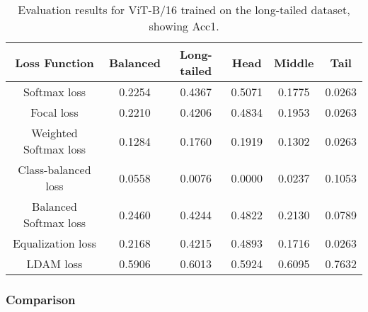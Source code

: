 \begin{table}[H]
    \centering
    \begin{tabular}{cccccc}
        \toprule
        Loss Function & Balanced & Long-tailed & Head & Middle & Tail \\ 
        \midrule
        Softmax loss   & 0.2254 & 0.4367 & 0.5071 & 0.1775 & 0.0263 \\
        Focal loss   & 0.2210 & 0.4206 & 0.4834 & 0.1953 & 0.0263 \\
        Weighted Softmax loss   & 0.1284 & 0.1760 & 0.1919 & 0.1302 & 0.0263 \\
        Class-balanced loss   & 0.0558 & 0.0076 & 0.0000 & 0.0237 & 0.1053 \\
        Balanced Softmax loss   & 0.2460 & 0.4244 & 0.4822 &  0.2130 & 0.0789 \\
        Equalization loss   & 0.2168 & 0.4215 & 0.4893 & 0.1716 & 0.0263 \\
        LDAM loss   & 0.5906 & 0.6013 & 0.5924 & 0.6095 & 0.7632 \\
        \bottomrule
    \end{tabular}
    \caption{Evaluation results for ViT-B/16 trained on the long-tailed dataset, showing Acc1.}
    \label{tab:vit_lt_acc1}
\end{table}

\subsubsection{Comparison}


